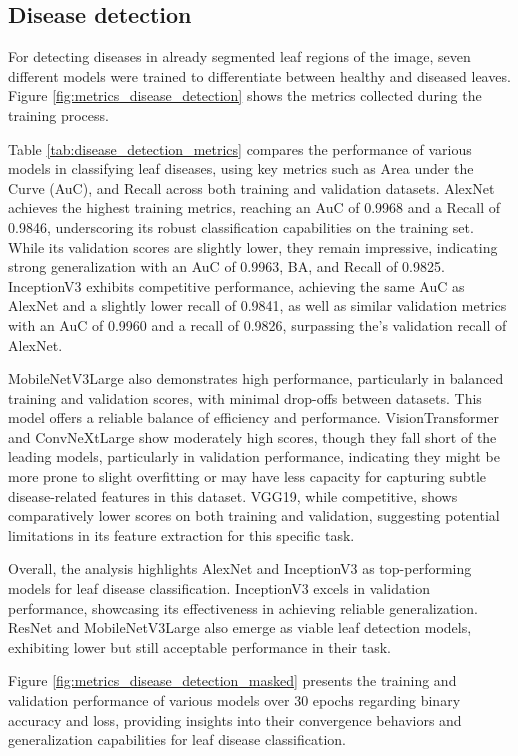 \documentclass[draft,final]{vutinfth} %
\begin{document}
\begin{appendix}
\section{Disease detection} \label{sec:disease_detection_result_training}
For detecting diseases in already segmented leaf regions of the image, seven different models were trained to differentiate between healthy and diseased leaves. Figure \ref{fig:metrics_disease_detection} shows the metrics collected during the training process.

Table \ref{tab:disease_detection_metrics} compares the performance of various models in classifying leaf diseases, using key metrics such as Area under the Curve (AuC), and Recall across both training and validation datasets. AlexNet achieves the highest training metrics, reaching an AuC of 0.9968 and a Recall of 0.9846, underscoring its robust classification capabilities on the training set. While its validation scores are slightly lower, they remain impressive, indicating strong generalization with an AuC of 0.9963, BA, and Recall of 0.9825. InceptionV3 exhibits competitive performance, achieving the same AuC as AlexNet and a slightly lower recall of 0.9841, as well as similar validation metrics with an AuC of 0.9960 and a recall of 0.9826, surpassing the's validation recall of AlexNet.

MobileNetV3Large also demonstrates high performance, particularly in balanced training and validation scores, with minimal drop-offs between datasets. This model offers a reliable balance of efficiency and performance. VisionTransformer and ConvNeXtLarge show moderately high scores, though they fall short of the leading models, particularly in validation performance, indicating they might be more prone to slight overfitting or may have less capacity for capturing subtle disease-related features in this dataset. VGG19, while competitive, shows comparatively lower scores on both training and validation, suggesting potential limitations in its feature extraction for this specific task.

Overall, the analysis highlights AlexNet and InceptionV3 as top-performing models for leaf disease classification. InceptionV3 excels in validation performance, showcasing its effectiveness in achieving reliable generalization. ResNet and MobileNetV3Large also emerge as viable leaf detection models, exhibiting lower but still acceptable performance in their task. 

Figure \ref{fig:metrics_disease_detection_masked} presents the training and validation performance of various models over 30 epochs regarding binary accuracy and loss, providing insights into their convergence behaviors and generalization capabilities for leaf disease classification.


\end{appendix}
\end{document}
